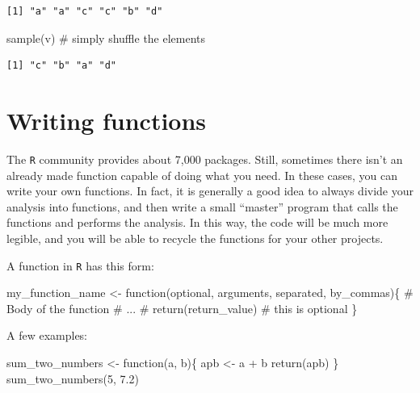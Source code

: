 \documentclass[
  letterpaper,
  DIV=11,
  numbers=noendperiod]{scrreprt}
\newenvironment{Shaded}{\begin{snugshade}}{\end{snugshade}}
\newcommand{\CommentTok}[1]{\textcolor[rgb]{0.37,0.37,0.37}{#1}}
\newcommand{\ControlFlowTok}[1]{\textcolor[rgb]{0.00,0.23,0.31}{#1}}
\newcommand{\DecValTok}[1]{\textcolor[rgb]{0.68,0.00,0.00}{#1}}
\newcommand{\FloatTok}[1]{\textcolor[rgb]{0.68,0.00,0.00}{#1}}
\newcommand{\FunctionTok}[1]{\textcolor[rgb]{0.28,0.35,0.67}{#1}}
\newcommand{\NormalTok}[1]{\textcolor[rgb]{0.00,0.23,0.31}{#1}}
\newcommand{\OtherTok}[1]{\textcolor[rgb]{0.00,0.23,0.31}{#1}}
\newcommand{\SpecialCharTok}[1]{\textcolor[rgb]{0.37,0.37,0.37}{#1}}
\begin{document}
\begin{verbatim}
[1] "a" "a" "c" "c" "b" "d"
\end{verbatim}

\begin{Shaded}
\begin{Highlighting}[]
\FunctionTok{sample}\NormalTok{(v) }\CommentTok{\# simply shuffle the elements}
\end{Highlighting}
\end{Shaded}

\begin{verbatim}
[1] "c" "b" "a" "d"
\end{verbatim}

\hypertarget{writing-functions}{%
\section{Writing functions}\label{writing-functions}}

The \texttt{R} community provides about 7,000 packages. Still, sometimes
there isn't an already made function capable of doing what you need. In
these cases, you can write your own functions. In fact, it is generally
a good idea to always divide your analysis into functions, and then
write a small ``master'' program that calls the functions and performs
the analysis. In this way, the code will be much more legible, and you
will be able to recycle the functions for your other projects.

A function in \texttt{R} has this form:

\begin{Shaded}
\begin{Highlighting}[]
\NormalTok{my\_function\_name }\OtherTok{\textless{}{-}} \ControlFlowTok{function}\NormalTok{(optional, arguments, separated, by\_commas)\{}
  \CommentTok{\# Body of the function}
  \CommentTok{\# ...}
  \CommentTok{\# }
  \FunctionTok{return}\NormalTok{(return\_value) }\CommentTok{\# this is optional}
\NormalTok{\}}
\end{Highlighting}
\end{Shaded}

A few examples:

\begin{Shaded}
\begin{Highlighting}[]
\NormalTok{sum\_two\_numbers }\OtherTok{\textless{}{-}} \ControlFlowTok{function}\NormalTok{(a, b)\{}
\NormalTok{  apb }\OtherTok{\textless{}{-}}\NormalTok{ a }\SpecialCharTok{+}\NormalTok{ b  }
  \FunctionTok{return}\NormalTok{(apb)}
\NormalTok{\}}
\FunctionTok{sum\_two\_numbers}\NormalTok{(}\DecValTok{5}\NormalTok{, }\FloatTok{7.2}\NormalTok{)}
\end{Highlighting}
\end{Shaded}
\end{document}
